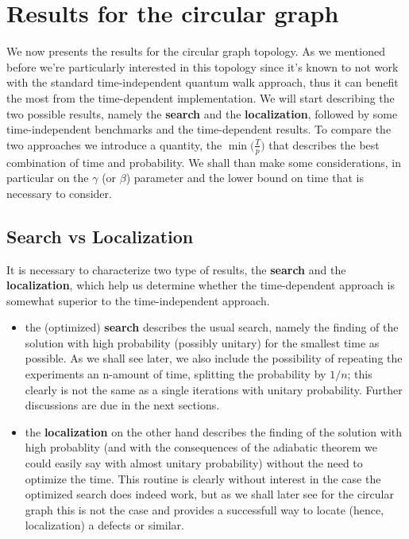 \documentclass[11pt, twoside]{report}
\begin{document}
\section{Results for the circular graph}
We now presents the results for the circular graph topology. As we mentioned before we're particularly interested in this topology since it's known to not work with the standard time-independent quantum walk approach, thus it can benefit the most from the time-dependent implementation. We will start describing the two possible results, namely the \textbf{search} and the \textbf{localization}, followed by some time-independent benchmarks and the time-dependent results. To compare the two approaches we introduce a quantity, the $\min\Big(\frac{T}{p}\Big)$ that describes the best combination of time and probability. We shall than make some considerations, in particular on the $\gamma$ (or $\beta$) parameter and the lower bound on time that is necessary to consider.

\subsection{Search vs Localization}
It is necessary to characterize two type of results, the \textbf{search} and the \textbf{localization}, which help us determine whether the time-dependent approach is somewhat superior to the time-independent approach.
  \begin{itemize}
    \item the (optimized) \textbf{search} describes the usual search, namely the finding of the solution with high probability (possibly unitary) for the smallest time as possible. As we shall see later, we also include the possibility of repeating the experiments an n-amount of time, splitting the probability by $1/n$; this clearly is not the same as a single iterations with unitary probability. Further discussions are due in the next sections.
    \item the \textbf{localization} on the other hand describes the finding of the solution with high probablity (and with the consequences of the adiabatic theorem we could easily say with almost unitary probability) without the need to optimize the time. This routine is clearly without interest in the case the optimized search does indeed work, but as we shall later see for the circular graph this is not the case and provides a successfull way to locate (hence, localization) a defects or similar.
  \end{itemize}
\end{document}
